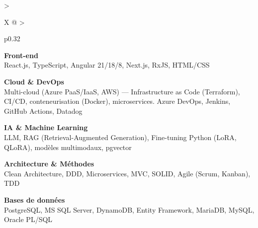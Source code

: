 \documentclass[10pt,a4paper]{article}
\begin{document}
\begin{tabularx}{\textwidth}{
  >{\raggedright\arraybackslash}X
  @{\hspace{1cm}}
  >{\raggedright\arraybackslash}p{0.32\textwidth}
}
\begin{minipage}[t]{\linewidth}
\textbf{\color{primary} Front-end}\\
\color{darkgray} React.js, TypeScript, Angular 21/18/8, Next.js, RxJS, HTML/CSS

\vspace{4pt}

\textbf{\color{primary} Cloud \& DevOps}\\
\color{darkgray} Multi-cloud (Azure PaaS/IaaS, AWS) --- Infrastructure as Code (Terraform), CI/CD, conteneurisation (Docker), microservices. Azure DevOps, Jenkins, GitHub Actions, Datadog

\vspace{4pt}

\textbf{\color{primary} IA \& Machine Learning}\\
\color{darkgray} LLM, RAG (Retrieval-Augmented Generation), Fine-tuning Python (LoRA, QLoRA), modèles multimodaux, pgvector

\vspace{4pt}

\textbf{\color{primary} Architecture \& Méthodes}\\
\color{darkgray} Clean Architecture, DDD, Microservices, MVC, SOLID, Agile (Scrum, Kanban), TDD

\vspace{4pt}

\textbf{\color{primary} Bases de données}\\
\color{darkgray} PostgreSQL, MS SQL Server, DynamoDB, Entity Framework, MariaDB, MySQL, Oracle PL/SQL

\vspace{4pt}

\end{minipage}
\\
\end{tabularx}
\end{document}

